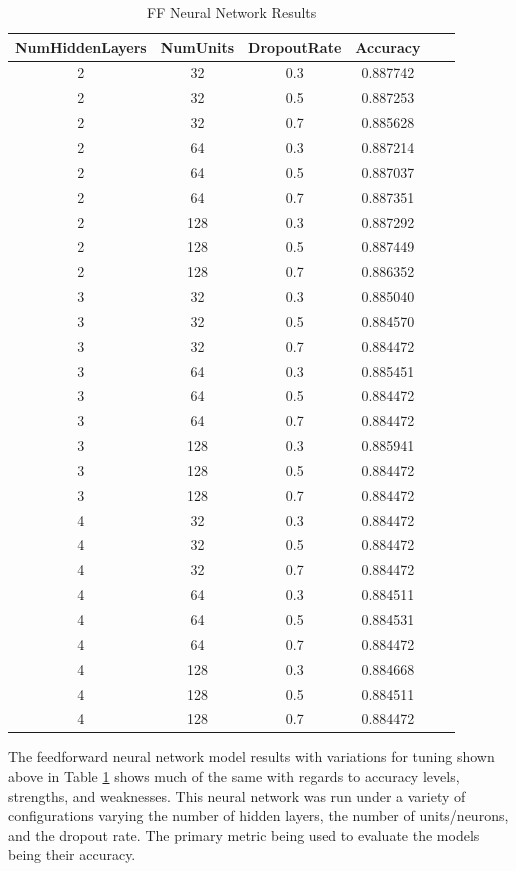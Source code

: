 \documentclass[12pt]{article}
\begin{document}
\begin{table}[htbp]
    \centering
    \caption{FF Neural Network Results}
    \begin{tabular}{cccccc}
        \toprule
        NumHiddenLayers & NumUnits & DropoutRate & Accuracy \\
        \midrule
        \rowcolor{green!25}2 & 32 & 0.3 & 0.887742 \\
        2 & 32 & 0.5 & 0.887253 \\
        2 & 32 & 0.7 & 0.885628 \\
        2 & 64 & 0.3 & 0.887214 \\
        2 & 64 & 0.5 & 0.887037 \\
        2 & 64 & 0.7 & 0.887351 \\
        2 & 128 & 0.3 & 0.887292 \\
        2 & 128 & 0.5 & 0.887449 \\
        2 & 128 & 0.7 & 0.886352 \\
        3 & 32 & 0.3 & 0.885040 \\
        3 & 32 & 0.5 & 0.884570 \\
        3 & 32 & 0.7 & 0.884472 \\
        3 & 64 & 0.3 & 0.885451 \\
        3 & 64 & 0.5 & 0.884472 \\
        3 & 64 & 0.7 & 0.884472 \\
        3 & 128 & 0.3 & 0.885941 \\
        3 & 128 & 0.5 & 0.884472 \\
        3 & 128 & 0.7 & 0.884472 \\
        4 & 32 & 0.3 & 0.884472 \\
        4 & 32 & 0.5 & 0.884472 \\
        4 & 32 & 0.7 & 0.884472 \\
        4 & 64 & 0.3 & 0.884511 \\
        4 & 64 & 0.5 & 0.884531 \\
        4 & 64 & 0.7 & 0.884472 \\
        4 & 128 & 0.3 & 0.884668 \\
        4 & 128 & 0.5 & 0.884511 \\
        4 & 128 & 0.7 & 0.884472 \\
        \bottomrule
    \end{tabular}
    \label{table:fFNeuralNetworkResults}
\end{table}

The feedforward neural network model results with variations for tuning shown above in Table \ref{table:fFNeuralNetworkResults} shows much of the same with regards to accuracy levels, strengths, and weaknesses. This neural network was run under a variety of configurations varying the number of hidden layers, the number of units/neurons, and the dropout rate. The primary metric being used to evaluate the models being their accuracy.
\end{document}
